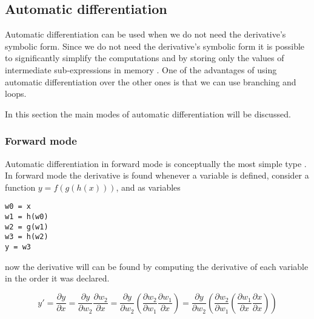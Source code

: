 \subsection{Automatic differentiation}

Automatic differentiation can be used when we do not need the derivative's symbolic form. Since we do not need the derivative's symbolic form it is possible to significantly simplify the computations and by storing only the values of intermediate sub-expressions in memory \cite{autodiff}. One of the advantages of using automatic differentiation over the other ones is that we can use branching and loops.

In this section the main modes of automatic differentiation will be discussed.

\subsubsection{Forward mode}

Automatic differentiation in forward mode is conceptually the most simple type \cite{autodiff}. In forward mode the derivative is found whenever a variable is defined, consider a function $y = f(g(h(x)))$, and as variables
\begin{lstlisting}
w0 = x
w1 = h(w0)
w2 = g(w1)
w3 = h(w2)
y = w3
\end{lstlisting}

now the derivative will can be found by computing the derivative of each variable in the order it was declared.

$$y' = \frac{\partial y}{\partial x} = \frac{\partial y}{\partial w_2} \frac{\partial w_2}{\partial x} = \frac{\partial y}{\partial w_2} \left(\frac{\partial w_2}{\partial w_1} \frac{\partial w_1}{\partial x}\right) = \frac{\partial y}{\partial w_2} \left(\frac{\partial w_2}{\partial w_1} \left(\frac{\partial w_1}{\partial x} \frac{\partial x}{\partial x}\right) \right)$$




